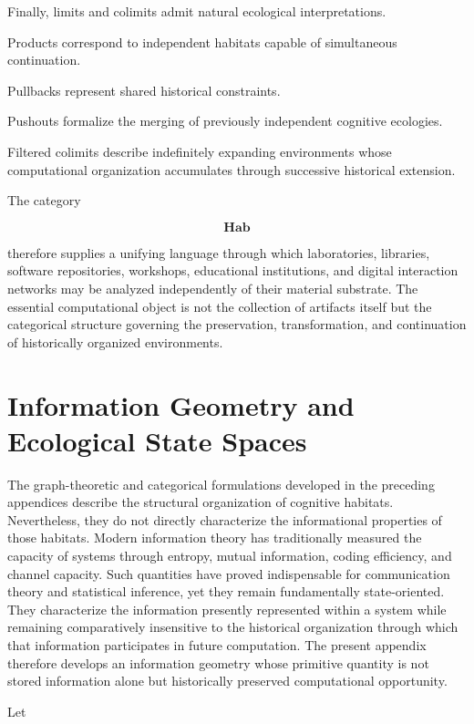 \documentclass[12pt,oneside]{article}
\theoremstyle{remark}
\begin{document}
Finally, limits and colimits admit natural ecological interpretations.

Products correspond to independent habitats capable of simultaneous
continuation.

Pullbacks represent shared historical constraints.

Pushouts formalize the merging of previously independent cognitive ecologies.

Filtered colimits describe indefinitely expanding environments whose
computational organization accumulates through successive historical extension.

The category

\[
\mathbf{Hab}
\]

therefore supplies a unifying language through which laboratories, libraries,
software repositories, workshops, educational institutions, and digital
interaction networks may be analyzed independently of their material substrate.
The essential computational object is not the collection of artifacts itself but
the categorical structure governing the preservation, transformation, and
continuation of historically organized environments.

\section{Information Geometry and Ecological State Spaces}

The graph-theoretic and categorical formulations developed in the preceding
appendices describe the structural organization of cognitive habitats.
Nevertheless, they do not directly characterize the informational properties of
those habitats. Modern information theory has traditionally measured the
capacity of systems through entropy, mutual information, coding efficiency, and
channel capacity. Such quantities have proved indispensable for communication
theory and statistical inference, yet they remain fundamentally state-oriented.
They characterize the information presently represented within a system while
remaining comparatively insensitive to the historical organization through which
that information participates in future computation. The present appendix
therefore develops an information geometry whose primitive quantity is not
stored information alone but historically preserved computational opportunity.

Let
\end{document}

